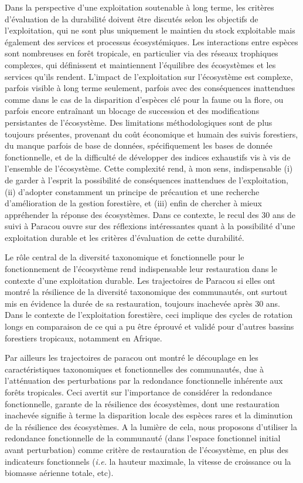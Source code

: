 \documentclass[
  11pt,
  french,
  A4paper,
  extrafontsizes,onecolumn,openright
  ]{memoir}
\begin{document}
Dans la perspective d'une exploitation soutenable à long terme, les
critères d'évaluation de la durabilité doivent être discutés selon les
objectifs de l'exploitation, qui ne sont plus uniquement le maintien du
stock exploitable mais également des services et processus
écosystémiques. Les interactions entre espèces sont nombreuses en forêt
tropicale, en particulier via des réseaux trophiques complexes, qui
définissent et maintiennent l'équilibre des écosystèmes et les services
qu'ils rendent. L'impact de l'exploitation sur l'écosystème est
complexe, parfois visible à long terme seulement, parfois avec des
conséquences inattendues comme dans le cas de la disparition d'espèces
clé pour la faune ou la flore, ou parfois encore entraînant un blocage
de succession et des modifications persistantes de l'écosystème. Des
limitations méthodologiques sont de plus toujours présentes, provenant
du coût économique et humain des suivis forestiers, du manque parfois de
base de données, spécifiquement les bases de donnée fonctionnelle, et de
la difficulté de développer des indices exhaustifs vis à vis de
l'ensemble de l'écosystème. Cette complexité rend, à mon sens,
indispensable (i) de garder à l'esprit la possibilité de conséquences
inattendues de l'exploitation, (ii) d'adopter constamment un principe de
précaution et une recherche d'amélioration de la gestion forestière, et
(iii) enfin de chercher à mieux appréhender la réponse des écosystèmes.
Dans ce contexte, le recul des 30 ans de suivi à Paracou ouvre sur des
réflexions intéressantes quant à la possibilité d'une exploitation
durable et les critères d'évaluation de cette durabilité.

Le rôle central de la diversité taxonomique et fonctionnelle pour le
fonctionnement de l'écosystème rend indispensable leur restauration dans
le contexte d'une exploitation durable. Les trajectoires de Paracou si
elles ont montré la résilience de la diversité taxonomique des
communautés, ont surtout mis en évidence la durée de sa restauration,
toujours inachevée après 30 ans. Dans le contexte de l'exploitation
forestière, ceci implique des cycles de rotation longs en comparaison de
ce qui a pu être éprouvé et validé pour d'autres bassins forestiers
tropicaux, notamment en Afrique.

Par ailleurs les trajectoires de paracou ont montré le découplage en les
caractéristiques taxonomiques et fonctionnelles des communautés, due à
l'atténuation des perturbations par la redondance fonctionnelle
inhérente aux forêts tropicales. Ceci avertit sur l'importance de
considérer la redondance fonctionnelle, garante de la résilience des
écosystèmes, dont une restauration inachevée signifie à terme la
disparition locale des espèces rares et la diminution de la résilience
des écosystèmes. A la lumière de cela, nous proposons d'utiliser la
redondance fonctionnelle de la communauté (dans l'espace fonctionnel
initial avant perturbation) comme critère de restauration de
l'écosystème, en plus des indicateurs fonctionnels (\emph{i.e.} la
hauteur maximale, la vitesse de croissance ou la biomasse aérienne
totale, etc).
\end{document}
